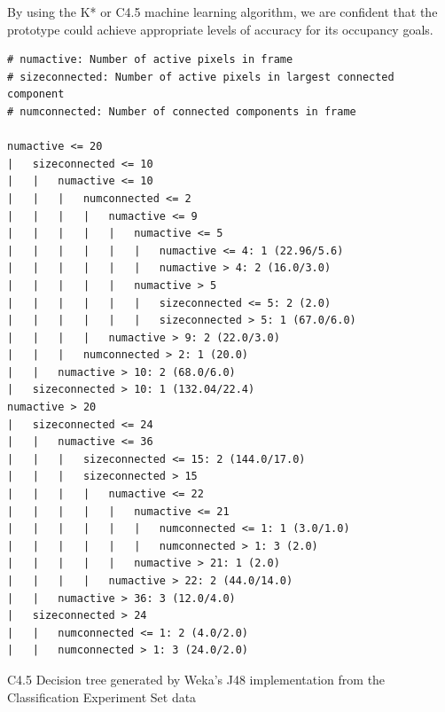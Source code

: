 \documentclass[../thesis/thesis.tex]{subfiles}
\begin{document}
By using the K* or C4.5 machine learning algorithm, we are confident that the prototype could achieve appropriate levels of accuracy for its occupancy goals.

\begin{listing}
\begin{verbatim}
# numactive: Number of active pixels in frame
# sizeconnected: Number of active pixels in largest connected component
# numconnected: Number of connected components in frame

numactive <= 20
|   sizeconnected <= 10
|   |   numactive <= 10
|   |   |   numconnected <= 2
|   |   |   |   numactive <= 9
|   |   |   |   |   numactive <= 5
|   |   |   |   |   |   numactive <= 4: 1 (22.96/5.6)
|   |   |   |   |   |   numactive > 4: 2 (16.0/3.0)
|   |   |   |   |   numactive > 5
|   |   |   |   |   |   sizeconnected <= 5: 2 (2.0)
|   |   |   |   |   |   sizeconnected > 5: 1 (67.0/6.0)
|   |   |   |   numactive > 9: 2 (22.0/3.0)
|   |   |   numconnected > 2: 1 (20.0)
|   |   numactive > 10: 2 (68.0/6.0)
|   sizeconnected > 10: 1 (132.04/22.4)
numactive > 20
|   sizeconnected <= 24
|   |   numactive <= 36
|   |   |   sizeconnected <= 15: 2 (144.0/17.0)
|   |   |   sizeconnected > 15
|   |   |   |   numactive <= 22
|   |   |   |   |   numactive <= 21
|   |   |   |   |   |   numconnected <= 1: 1 (3.0/1.0)
|   |   |   |   |   |   numconnected > 1: 3 (2.0)
|   |   |   |   |   numactive > 21: 1 (2.0)
|   |   |   |   numactive > 22: 2 (44.0/14.0)
|   |   numactive > 36: 3 (12.0/4.0)
|   sizeconnected > 24
|   |   numconnected <= 1: 2 (4.0/2.0)
|   |   numconnected > 1: 3 (24.0/2.0)
\end{verbatim}
\caption{C4.5 Decision tree generated by Weka's J48 implementation from the Classification Experiment Set data}
\label{lst:tree}
\end{listing}
\end{document}
